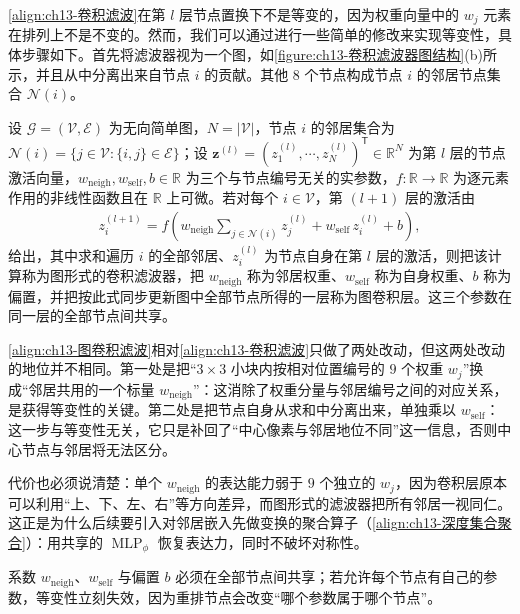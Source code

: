 \documentclass[../../main.tex]{subfiles}
\begin{document}
\eqref{align:ch13-卷积滤波}在第 $l$ 层节点置换下不是等变的，因为权重向量中的 $w_j$ 元素在排列上不是不变的。然而，我们可以通过进行一些简单的修改来实现等变性，具体步骤如下。首先将滤波器视为一个图，如\cref{figure:ch13-卷积滤波器图结构}(b)所示，并且从中分离出来自节点 $i$ 的贡献。其他 $8$ 个节点构成节点 $i$ 的邻居节点集合 $\mathcal{N}(i)$。

\begin{definition}[图形式的卷积滤波器]\label{definition:ch13-图形式卷积滤波器}
设 $\mathcal{G}=(\mathcal{V},\mathcal{E})$ 为无向简单图，$N=|\mathcal{V}|$，节点 $i$ 的邻居集合为 $\mathcal{N}(i)=\{j\in\mathcal{V}:\{i,j\}\in\mathcal{E}\}$；设 $\bm{z}^{(l)}=(z_1^{(l)},\cdots,z_N^{(l)})^{\mathsf T}\in\mathbb{R}^{N}$ 为第 $l$ 层的节点激活向量，$w_{\mathrm{neigh}},w_{\mathrm{self}},b\in\mathbb{R}$ 为三个与节点编号无关的实参数，$f:\mathbb{R}\to\mathbb{R}$ 为逐元素作用的非线性函数且在 $\mathbb{R}$ 上可微。若对每个 $i\in\mathcal{V}$，第 $(l+1)$ 层的激活由
\begin{align}
z_i^{(l+1)}=f\!\left(w_{\mathrm{neigh}}\sum_{j\in\mathcal{N}(i)}z_j^{(l)}+w_{\mathrm{self}}\,z_i^{(l)}+b\right),
\label{align:ch13-图卷积滤波}
\end{align}
给出，其中求和遍历 $i$ 的全部邻居、$z_i^{(l)}$ 为节点自身在第 $l$ 层的激活，则把该计算称为图形式的卷积滤波器，把 $w_{\mathrm{neigh}}$ 称为邻居权重、$w_{\mathrm{self}}$ 称为自身权重、$b$ 称为偏置，并把按此式同步更新图中全部节点所得的一层称为图卷积层。这三个参数在同一层的全部节点间共享。
\end{definition}

\begin{remark}
\eqref{align:ch13-图卷积滤波}相对\eqref{align:ch13-卷积滤波}只做了两处改动，但这两处改动的地位并不相同。第一处是把“$3\times 3$ 小块内按相对位置编号的 $9$ 个权重 $w_j$”换成“邻居共用的一个标量 $w_{\mathrm{neigh}}$”：这消除了权重分量与邻居编号之间的对应关系，是获得等变性的关键。第二处是把节点自身从求和中分离出来，单独乘以 $w_{\mathrm{self}}$：这一步与等变性无关，它只是补回了“中心像素与邻居地位不同”这一信息，否则中心节点与邻居将无法区分。\par
代价也必须说清楚：单个 $w_{\mathrm{neigh}}$ 的表达能力弱于 $9$ 个独立的 $w_j$，因为卷积层原本可以利用“上、下、左、右”等方向差异，而图形式的滤波器把所有邻居一视同仁。这正是为什么后续要引入对邻居嵌入先做变换的聚合算子（\eqref{align:ch13-深度集合聚合}）：用共享的 $\operatorname{MLP}_\phi$ 恢复表达力，同时不破坏对称性。\par
系数 $w_{\mathrm{neigh}}$、$w_{\mathrm{self}}$ 与偏置 $b$ 必须在全部节点间共享；若允许每个节点有自己的参数，等变性立刻失效，因为重排节点会改变“哪个参数属于哪个节点”。
\end{remark}
\end{document}
